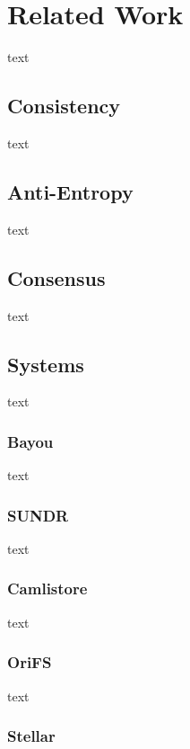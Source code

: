 \documentclass{article}
\begin{document}
\section{Related Work}

text

\subsection{Consistency}

text

\subsection{Anti-Entropy}

text

\subsection{Consensus}

text

\subsection{Systems}

text

\subsubsection{Bayou}

text

\subsubsection{SUNDR}

text

\subsubsection{Camlistore}

text

\subsubsection{OriFS}

text

\subsubsection{Stellar}
\end{document}
